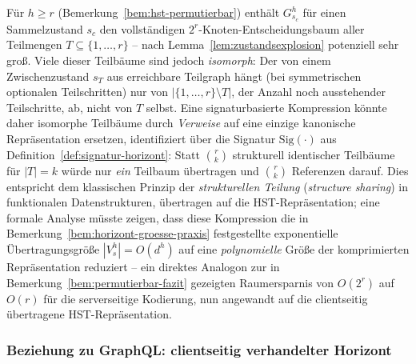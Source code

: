﻿\documentclass[a4paper,12pt]{article}
\theoremstyle{definition}
\begin{document}
Für $h\ge r$ (Bemerkung~\ref{bem:hst-permutierbar}) enthält $G_{s_c}^h$ für einen
Sammelzustand $s_c$ den vollständigen $2^r$-Knoten-Entscheidungsbaum aller Teilmengen
$T\subseteq\{1,\ldots,r\}$ -- nach Lemma~\ref{lem:zustandsexplosion} potenziell sehr
groß. Viele dieser Teilbäume sind jedoch \emph{isomorph}: Der von einem Zwischenzustand
$s_T$ aus erreichbare Teilgraph hängt (bei symmetrischen optionalen Teilschritten) nur
von $|\{1,\ldots,r\}\setminus T|$, der Anzahl noch ausstehender Teilschritte, ab, nicht
von $T$ selbst. Eine signaturbasierte Kompression könnte daher isomorphe Teilbäume durch
\emph{Verweise} auf eine einzige kanonische Repräsentation ersetzen, identifiziert über
die Signatur $\mathrm{Sig}(\cdot)$ aus Definition~\ref{def:signatur-horizont}: Statt
$\binom{r}{k}$ strukturell identischer Teilbäume für $|T|=k$ würde nur \emph{ein}
Teilbaum übertragen und $\binom{r}{k}$ Referenzen darauf. Dies entspricht dem
klassischen Prinzip der \emph{strukturellen Teilung} (\emph{structure sharing}) in
funktionalen Datenstrukturen, übertragen auf die HST-Repräsentation; eine formale
Analyse müsste zeigen, dass diese Kompression die in
Bemerkung~\ref{bem:horizont-groesse-praxis} festgestellte exponentielle
Übertragungsgröße $|V_s^h|=O(d^h)$ auf eine \emph{polynomielle} Größe der komprimierten
Repräsentation reduziert -- ein direktes Analogon zur in
Bemerkung~\ref{bem:permutierbar-fazit} gezeigten Raumersparnis von $O(2^r)$ auf $O(r)$
für die serverseitige Kodierung, nun angewandt auf die clientseitig übertragene
HST-Repräsentation.

\subsubsection{Beziehung zu GraphQL: clientseitig verhandelter Horizont}
\end{document}
